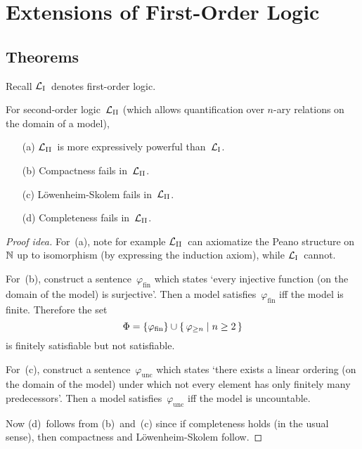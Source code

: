 %
%
\section{Extensions of First-Order Logic}
\subsection*{Theorems}
Recall \(\mathcal{L}_{\mathrm{I}}\)~denotes first-order logic.
\begin{thm}[\(\Ls\)]
For second-order logic~\(\Ls\) (which allows quantification over \(n\)-ary relations on the domain of a model),
\begin{enumerate}[itemsep=0pt]
\item[(a)] \(\Ls\)~is more expressively powerful than~\(\mathcal{L}_{\mathrm{I}}\).
\item[(b)] Compactness fails in~\(\Ls\).
\item[(c)] L\"owenheim-Skolem fails in~\(\Ls\).
\item[(d)] Completeness fails in~\(\Ls\).
\end{enumerate}
\end{thm}
\begin{proof}[Proof idea]
For~(a), note for example \(\Ls\)~can axiomatize the Peano structure on~\(\mathbb{N}\) up to isomorphism (by expressing the induction axiom), while \(\mathcal{L}_{\mathrm{I}}\)~cannot.

For~(b), construct a sentence~\(\varphi_{\mathrm{fin}}\) which states `every injective function (on the domain of the model) is surjective'. Then a model satisfies~\(\varphi_{\mathrm{fin}}\) iff the model is finite. Therefore the set
\[\Phi=\{\varphi_{\mathrm{fin}}\}\cup\{\,\varphi_{\ge n}\mid n\ge 2\,\}\]
is finitely satisfiable but not satisfiable.

For~(c), construct a sentence~\(\varphi_{\mathrm{unc}}\) which states `there exists a linear ordering (on the domain of the model) under which not every element has only finitely many predecessors'. Then a model satisfies~\(\varphi_{\mathrm{unc}}\) iff the model is uncountable.

Now (d)~follows from (b)~and~(c) since if completeness holds (in the usual sense), then compactness and L\"owenheim-Skolem follow.
\end{proof}

